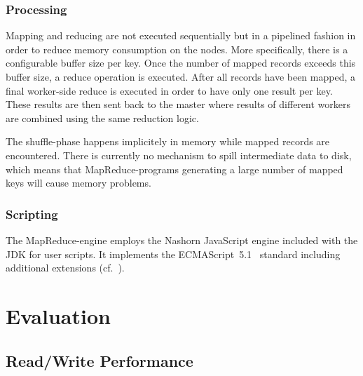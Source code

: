 \subsubsection{Processing}

Mapping and reducing are not executed sequentially but in a pipelined fashion in order
to reduce memory consumption on the nodes.
More specifically, there is a configurable buffer size per key.
Once the number of mapped records exceeds this buffer size, a reduce operation is executed.
After all records have been mapped, a final worker-side reduce is executed in order
to have only one result per key.
These results are then sent back to the master where results of different workers
are combined using the same reduction logic.

The shuffle-phase happens implicitely in memory while mapped records are encountered.
There is currently no mechanism to spill intermediate data to disk, which means that MapReduce-programs
generating a large number of mapped keys will cause memory problems.


\subsubsection{Scripting}
The MapReduce-engine employs the Nashorn JavaScript engine \cite{Nashorn} included
with the JDK for user scripts.
It implements the ECMAScript~5.1~\cite{Ecma} standard including additional
extensions (cf.~\cite{Nashorn2}).



\section{Evaluation}
\label{sec:evaluation}

\subsection{Read/Write Performance}

